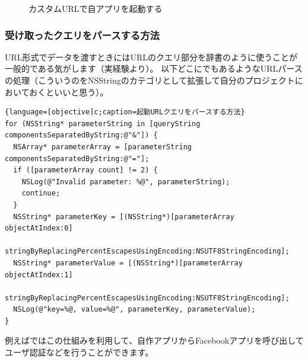 \begin{figure}
  \centering
  \caption{カスタムURLで自アプリを起動する}
\end{figure}


\subsubsection{受け取ったクエリをパースする方法}
URL形式でデータを渡すときにはURLのクエリ部分を辞書のように使うことが一般的である気がします（実経験より）。
以下どこにでもあるようなURLパースの処理（こういうのをNSStringのカテゴリとして拡張して自分のプロジェクトにおいておくといいと思う）。
\begin{lstlisting}{language=[objective]c;caption=起動URLクエリをパースする方法}
for (NSString* parameterString in [queryString componentsSeparatedByString:@"&"]) {
  NSArray* parameterArray = [parameterString componentsSeparatedByString:@"="];
  if ([parameterArray count] != 2) {
	NSLog(@"Invalid parameter: %@", parameterString);
	continue;
  }
  NSString* parameterKey = [(NSString*)[parameterArray objectAtIndex:0]
	stringByReplacingPercentEscapesUsingEncoding:NSUTF8StringEncoding];
  NSString* parameterValue = [(NSString*)[parameterArray objectAtIndex:1]
	stringByReplacingPercentEscapesUsingEncoding:NSUTF8StringEncoding];
  NSLog(@"key=%@, value=%@", parameterKey, parameterValue);
}
\end{lstlisting}
例えばではこの仕組みを利用して、自作アプリからFacebookアプリを呼び出してユーザ認証などを行うことができます。

